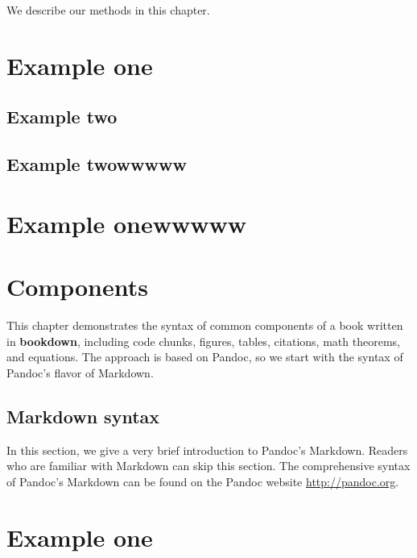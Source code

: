 \documentclass[]{krantz}
\begin{document}
We describe our methods in this chapter.

\hypertarget{example-one}{%
\chapter{Example one}\label{example-one}}

\hypertarget{example-two}{%
\section{Example two}\label{example-two}}

\hypertarget{example-twowwwww}{%
\section{Example twowwwww}\label{example-twowwwww}}

\hypertarget{example-onewwwww}{%
\chapter{Example onewwwww}\label{example-onewwwww}}

\hypertarget{components}{%
\chapter{Components}\label{components}}

This chapter demonstrates the syntax of common components of a book written in \textbf{bookdown}, including code chunks, figures, tables, citations, math theorems, and equations. The approach is based on Pandoc, so we start with the syntax of Pandoc's flavor of Markdown.

\hypertarget{markdown-syntax}{%
\section{Markdown syntax}\label{markdown-syntax}}

In this section, we give a very brief introduction to Pandoc's Markdown. Readers who are familiar with Markdown can skip this section. The comprehensive syntax of Pandoc's Markdown can be found on the Pandoc website \url{http://pandoc.org}.

\hypertarget{appendix-apendice}{%
\appendix {}}


\hypertarget{example-one-1}{%
\chapter{Example one}\label{example-one-1}}
\end{document}
